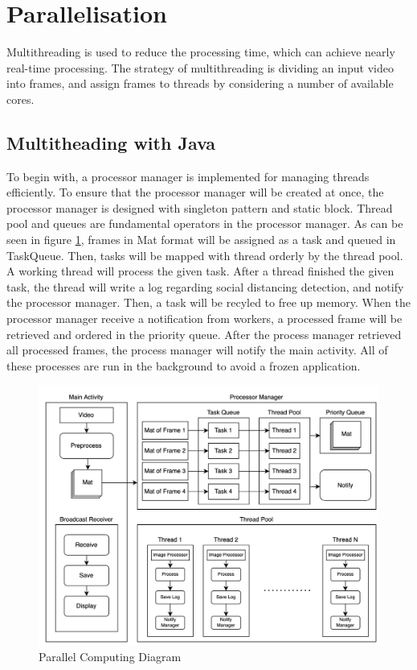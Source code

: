     \section{Parallelisation}
        Multithreading is used to reduce the processing time, which can achieve nearly real-time processing.
        The strategy of multithreading is dividing an input video into frames,
        and assign frames to threads by considering a number of available cores.

        \subsection{Multitheading with Java}

            To begin with, a processor manager is implemented for managing threads efficiently.
            To ensure that the processor manager will be created at once,
            the processor manager is designed with singleton pattern and static block.
            Thread pool and queues are fundamental operators in the processor manager.
            As can be seen in figure \ref{parallelJava}, frames in Mat format will be assigned as a task and queued in TaskQueue.
            Then, tasks will be mapped with thread orderly by the thread pool.
            A working thread will process the given task.
            After a thread finished the given task,
            the thread will write a log regarding social distancing detection, and notify the processor manager.
            Then, a task will be recyled to free up memory.
            When the processor manager receive a notification from workers,
            a processed frame will be retrieved and ordered in the priority queue.
            After the process manager retrieved all processed frames,
            the process manager will notify the main activity.
            All of these processes are run in the background to avoid a frozen application.

            \begin{figure}[!ht]
                \includegraphics[width=6in]{images/chapter3/parallel.png}
                \caption{Parallel Computing Diagram}
                \label{parallelJava}
            \end{figure}

